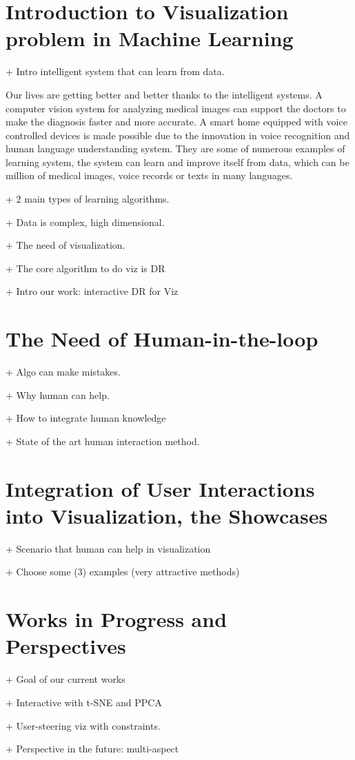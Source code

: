 \section{Introduction to Visualization problem in Machine Learning}

+ Intro intelligent system that can learn from data.

Our lives are getting better and better thanks to the intelligent systems.
A computer vision system for analyzing medical images can support the doctors to make the diagnosis faster and more accurate.
A smart home equipped with voice controlled devices is made possible due to the innovation in voice recognition and human language understanding system.
They are some of numerous examples of learning system, the system can learn and improve itself from data, which can be million of medical images, voice records or texts in many languages.

+ 2 main types of learning algorithms.

+ Data is complex, high dimensional.

+ The need of visualization.

+ The core algorithm to do viz is DR

+ Intro our work: interactive DR for Viz

\section{The Need of Human-in-the-loop}

+ Algo can make mistakes.

+ Why human can help.

+ How to integrate human knowledge

+ State of the art human interaction method.

\section{Integration of User Interactions into Visualization, the Showcases}

+ Scenario that human can help in visualization

+ Choose some (3) examples (very attractive methods)

\section{Works in Progress and Perspectives}

+ Goal of our current works

+ Interactive with t-SNE and PPCA

+ User-steering viz with constraints.

+ Perspective in the future: multi-aspect